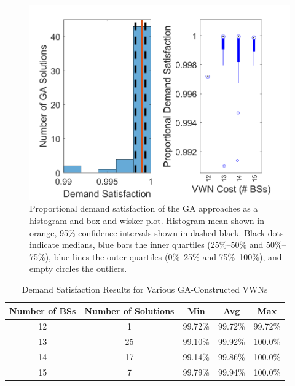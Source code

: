\documentclass[12pt,dvipsnames]{report}
\begin{document}
\begin{figure}[ht]
	\centering
	\includegraphics[height=0.4\textheight]{Figures/Prelim_GAEval_VAE_HistogramBoxplot}
	\caption[Preliminary simulations GA demand satisfaction]{Proportional demand satisfaction of the GA approaches as a histogram and box-and-wisker plot.  Histogram mean shown in orange, 95\% confidence intervals shown in dashed black. Black dots indicate medians, blue bars the inner quartiles (25\%--50\% and 50\%--75\%), blue lines the outer quartiles (0\%--25\% and 75\%--100\%), and empty circles the outliers.}
	\label{fig:Prelim_GAEval_Histogram}
\end{figure}

\begin{table}[htp]
	\centering
	\caption[Preliminary Simulation Demand Satisfaction of GA-Constructed VWNs]{Demand Satisfaction Results for Various GA-Constructed VWNs}
	\begin{tabular}{|c|c|c|c|c|} 
		\hline
		\textbf{Number of BSs} & \textbf{Number of Solutions} & \textbf{Min} & \textbf{Avg} & \textbf{Max} \\
		\hline
		12 & 1 & 99.72\% & 99.72\% & 99.72\% \\
		\hline
		13 & 25 & 99.10\% & 99.92\% & 100.0\% \\
		\hline
		14 & 17 & 99.14\% & 99.86\% & 100.0\% \\
		\hline
		15 & 7 & 99.79\% & 99.94\% & 100.0\% \\
		\hline
	\end{tabular}
	\label{tab:Prelim_GADemandSatisfaction}
\end{table}
\end{document}
